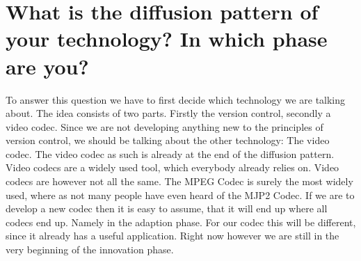 \documentclass[a4paper]{article}
\begin{document}
\section{What is the diffusion pattern of your technology? In which phase are you?}
To answer this question we have to first decide which technology we are talking about. The idea consists of two parts. Firstly the version control, secondly a video codec. Since we are not developing anything new to the principles of version control, we should be talking about the other technology: The video codec. The video codec as such is already at the end of the diffusion pattern. Video codecs are a widely used tool, which everybody already relies on. Video codecs are however not all the same. The MPEG Codec is surely the most widely used, where as not many people have even heard of the MJP2 Codec. If we are to develop a new codec then it is easy to assume, that it will end up where all codecs end up. Namely in the adaption phase. For our codec this will be different, since it already has a useful application. Right now however we are still in the very beginning of the innovation phase.
 

\theendnotes
\end{document}
